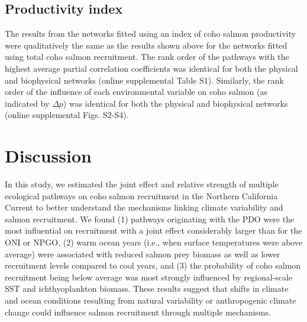 \subsection{Productivity index}

The results from the networks fitted using an index of coho salmon productivity
were qualitatively the same as the results shown above for the networks fitted
using total coho salmon recruitment. The rank order of the pathways with the
highest average partial correlation coefficients was identical for both the
physical and biophysical networks (online supplemental Table S1). Similarly, the
rank order of the influence of each environmental variable on coho salmon (as
indicated by \(\Delta p\)) was identical for both the physical and biophysical
networks (online supplemental Figs. S2-S4).



\section{Discussion}

In this study, we estimated the joint effect and relative strength of multiple
ecological pathways on coho salmon recruitment in the Northern California
Current to better understand the mechanisms linking climate variability and
salmon recruitment. We found (1) pathways originating with the PDO were the most
influential on recruitment with a joint effect considerably larger than for the
ONI or NPGO, (2) warm ocean years (i.e., when surface temperatures were above
average) were associated with reduced salmon prey biomass as well as lower
recruitment levels compared to cool years, and (3) the probability of coho
salmon recruitment being below average was most strongly influenced by
regional-scale SST and ichthyoplankton biomass. These results suggest that
shifts in climate and ocean conditions resulting from natural variability or
anthropogenic climate change could influence salmon recruitment through multiple
mechanisms.

